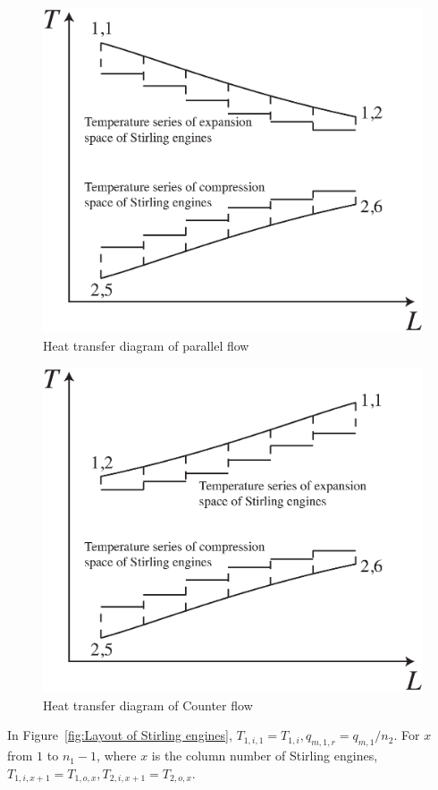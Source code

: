 \documentclass{article}
\begin{document}
\noindent \begin{figure}[htbp]
\begin{center}
	\includegraphics[width = 0.7\columnwidth]{./graphics/HeatTransfer_Parallel}
	\caption{Heat transfer diagram of parallel flow}
	\label{fig:ParallelFlow}
\end{center}
\end{figure}

\noindent \begin{figure}[htbp]
\begin{center}
	\includegraphics[width = 0.7\columnwidth]{./graphics/HeatTransfer_Counter}
	\caption{Heat transfer diagram of Counter flow}
	\label{fig:CounterFlow}
\end{center}
\end{figure}

In Figure~\ref{fig:Layout of Stirling engines}, $T_{1,i,1}=T_{1,i},q_{m,1,r}=q_{m,1}/n_{2}$. For $x$ from $1$ to $n_1-1$, where $x$ is the column number of Stirling engines, $T_{1,i,x+1}=T_{1,o,x},T_{2,i,x+1}=T_{2,o,x}$.
\end{document}
